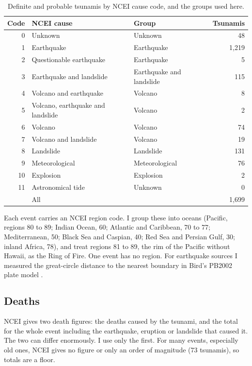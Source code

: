 \documentclass[11pt,a4paper]{article}
\begin{document}
\begin{table}[tbp]\centering\small\caption{Definite and probable tsunamis by NCEI cause code, and the groups used here.}\label{tab:causes}\begin{tabular}{rllr}\toprule Code & NCEI cause & Group & Tsunamis\\\midrule
0 & Unknown & Unknown & 48\\
1 & Earthquake & Earthquake & 1,219\\
2 & Questionable earthquake & Earthquake & 5\\
3 & Earthquake and landslide & Earthquake and landslide & 115\\
4 & Volcano and earthquake & Volcano & 8\\
5 & Volcano, earthquake and landslide & Volcano & 2\\
6 & Volcano & Volcano & 74\\
7 & Volcano and landslide & Volcano & 19\\
8 & Landslide & Landslide & 131\\
9 & Meteorological & Meteorological & 76\\
10 & Explosion & Explosion & 2\\
11 & Astronomical tide & Unknown & 0\\
\midrule & All & & 1,699\\\bottomrule\end{tabular}\end{table}

Each event carries an NCEI region code. I group these into oceans (Pacific, regions 80 to 89; Indian Ocean, 60; Atlantic and Caribbean, 70 to 77; Mediterranean, 50; Black Sea and Caspian, 40; Red Sea and Persian Gulf, 30; inland Africa, 78), and treat regions 81 to 89, the rim of the Pacific without Hawaii, as the Ring of Fire. One event has no region. For earthquake sources I measured the great-circle distance to the nearest boundary in Bird's PB2002 plate model \citep{bird}.

\subsection{Deaths}
NCEI gives two death figures: the deaths caused by the tsunami, and the total for the whole event including the earthquake, eruption or landslide that caused it. The two can differ enormously. I use only the first. For many events, especially old ones, NCEI gives no figure or only an order of magnitude (73 tsunamis), so totals are a floor.
\end{document}
